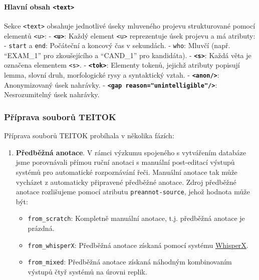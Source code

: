 \documentclass[
]{article}
\providecommand{\tightlist}{%
  \setlength{\itemsep}{0pt}\setlength{\parskip}{0pt}}
\begin{document}
\hypertarget{hlavnuxed-obsah-text}{%
\paragraph{\texorpdfstring{Hlavní obsah
\texttt{\textless{}text\textgreater{}}}{Hlavní obsah \textless text\textgreater{}}}\label{hlavnuxed-obsah-text}}

Sekce \texttt{\textless{}text\textgreater{}} obsahuje jednotlivé úseky
mluveného projevu strukturované pomocí elementů
\texttt{\textless{}u\textgreater{}}: -
\textbf{\texttt{\textless{}u\textgreater{}}}: Každý element
\texttt{\textless{}u\textgreater{}} reprezentuje úsek projevu a má
atributy: - \texttt{start} a \texttt{end}: Počáteční a koncový čas v
sekundách. - \texttt{who}: Mluvčí (např. ``EXAM\_1'' pro zkoušejícího a
``CAND\_1'' pro kandidáta). -
\textbf{\texttt{\textless{}s\textgreater{}}}: Každá věta je označena
elementem \texttt{\textless{}s\textgreater{}}. -
\textbf{\texttt{\textless{}tok\textgreater{}}}: Elementy tokenů, jejichž
atributy popisují lemma, slovní druh, morfologické rysy a syntaktický
vztah. - \textbf{\texttt{\textless{}anon/\textgreater{}}}: Anonymizovaný
úsek nahrávky. -
\textbf{\texttt{\textless{}gap\ reason="unintelligible"/\textgreater{}}}:
Nesrozumitelný úsek nahrávky.

\hypertarget{pux159uxedprava-souborux16f-teitok}{%
\subsubsection{Příprava souborů
TEITOK}\label{pux159uxedprava-souborux16f-teitok}}

Příprava souborů TEITOK probíhala v několika fázích:

\begin{enumerate}
\def\labelenumi{\arabic{enumi}.}
\tightlist
\item
  \textbf{Předběžná anotace}. V rámci výzkumu spojeného s vytvářením
  databáze jsme porovnávali přímou ruční anotaci s manuální post-editací
  výstupů systémů pro automatické rozpoznávání řeči. Manuální anotace
  tak může vycházet z automaticky připravené předběžné anotace. Zdroj
  předběžné anotace rozlišujeme pomocí atributu
  \texttt{preannot-source}, jehož hodnota může být:

  \begin{itemize}
  \tightlist
  \item
    \texttt{from\_scratch}: Kompletně manuální anotace, t.j. předběžná
    anotace je prázdná.
  \item
    \texttt{from\_whisperX}: Předběžná anotace získaná pomocí systému
    \href{https://github.com/m-bain/whisperX}{WhisperX}.
  \item
    \texttt{from\_mixed}: Předběžná anotace získaná náhodným
    kombinovaním výstupů čtyř systémů na úrovni replik.
  \end{itemize}
\end{enumerate}
\end{document}
